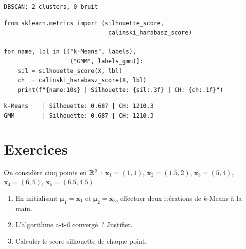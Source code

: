 \begin{codeoutput}
\begin{verbatim}
DBSCAN: 2 clusters, 0 bruit
\end{verbatim}
\end{codeoutput}

\begin{codeblock}[title=\textbf{Comparaison des indices de validit\'e}]
\begin{verbatim}
from sklearn.metrics import (silhouette_score,
                              calinski_harabasz_score)

for name, lbl in [("k-Means", labels),
                   ("GMM", labels_gmm)]:
    sil = silhouette_score(X, lbl)
    ch  = calinski_harabasz_score(X, lbl)
    print(f"{name:10s} | Silhouette: {sil:.3f} | CH: {ch:.1f}")
\end{verbatim}
\end{codeblock}

\begin{codeoutput}
\begin{verbatim}
k-Means    | Silhouette: 0.687 | CH: 1210.3
GMM        | Silhouette: 0.687 | CH: 1210.3
\end{verbatim}
\end{codeoutput}

\section{Exercices}
\label{sec:exercises-ch8}

\begin{exercice}
On consid\`ere cinq points en $\mathbb{R}^2$~:
$\bm{x}_1 = (1,1)$, $\bm{x}_2 = (1.5, 2)$, $\bm{x}_3 = (5,4)$,
$\bm{x}_4 = (6,5)$, $\bm{x}_5 = (6.5, 4.5)$.
\begin{enumerate}
  \item En initialisant $\bm{\mu}_1 = \bm{x}_1$ et $\bm{\mu}_2 = \bm{x}_3$,
    effectuer deux it\'erations de $k$-Means \`a la main.
  \item L'algorithme a-t-il converg\'e~? Justifier.
  \item Calculer le score silhouette de chaque point.
\end{enumerate}
\end{exercice}

